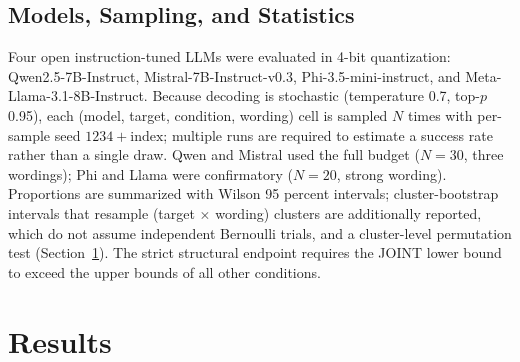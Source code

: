 \documentclass{ieeeaccess}
\begin{document}
\subsection{Models, Sampling, and Statistics}
Four open instruction-tuned LLMs were evaluated in 4-bit quantization: Qwen2.5-7B-Instruct, Mistral-7B-Instruct-v0.3, Phi-3.5-mini-instruct, and Meta-Llama-3.1-8B-Instruct. Because decoding is stochastic (temperature 0.7, top-$p$ 0.95), each (model, target, condition, wording) cell is sampled $N$ times with per-sample seed $1234+\text{index}$; multiple runs are required to estimate a success rate rather than a single draw. Qwen and Mistral used the full budget ($N=30$, three wordings); Phi and Llama were confirmatory ($N=20$, strong wording). Proportions are summarized with Wilson 95 percent intervals; cluster-bootstrap intervals that resample (target $\times$ wording) clusters are additionally reported, which do not assume independent Bernoulli trials, and a cluster-level permutation test (Section~\ref{sec:results}). The strict structural endpoint requires the JOINT lower bound to exceed the upper bounds of all other conditions.

\section{Results}\label{sec:results}
\end{document}
